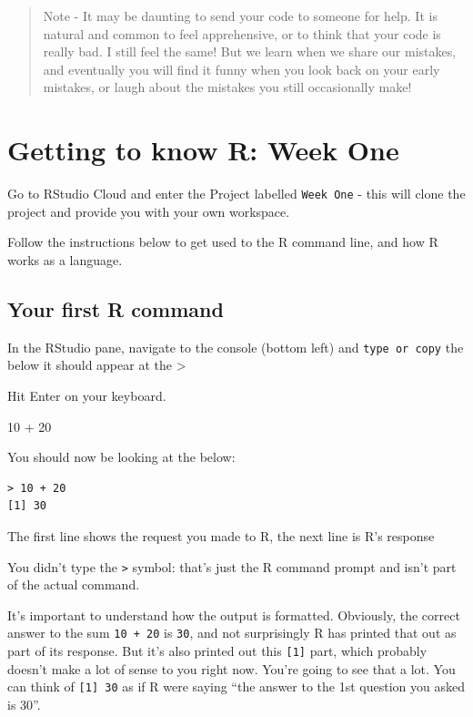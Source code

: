 \documentclass[
]{book}
\newenvironment{Shaded}{\begin{snugshade}}{\end{snugshade}}
\newcommand{\DecValTok}[1]{\textcolor[rgb]{0.00,0.00,0.81}{#1}}
\newcommand{\SpecialCharTok}[1]{\textcolor[rgb]{0.00,0.00,0.00}{#1}}
\begin{document}
\begin{quote}
Note - It may be daunting to send your code to someone for help. It is natural and common to feel apprehensive, or to think that your code is really bad. I still feel the same! But we learn when we share our mistakes, and eventually you will find it funny when you look back on your early mistakes, or laugh about the mistakes you still occasionally make!
\end{quote}

\hypertarget{getting-to-know-r-week-one}{%
\chapter{Getting to know R: Week One}\label{getting-to-know-r-week-one}}

Go to RStudio Cloud and enter the Project labelled \texttt{Week\ One} - this will clone the project and provide you with your own workspace.

Follow the instructions below to get used to the R command line, and how R works as a language.

\hypertarget{your-first-r-command}{%
\section{Your first R command}\label{your-first-r-command}}

In the RStudio pane, navigate to the console (bottom left) and \texttt{type\ or\ copy} the below it should appear at the \textgreater{}

Hit Enter on your keyboard.

\begin{Shaded}
\begin{Highlighting}[]
\DecValTok{10} \SpecialCharTok{+} \DecValTok{20}
\end{Highlighting}
\end{Shaded}

You should now be looking at the below:

\begin{verbatim}
> 10 + 20
[1] 30
\end{verbatim}

The first line shows the request you made to R, the next line is R's response

You didn't type the \texttt{\textgreater{}} symbol: that's just the R command prompt and isn't part of the actual command.

It's important to understand how the output is formatted. Obviously, the correct answer to the sum \texttt{10\ +\ 20} is \texttt{30}, and not surprisingly R has printed that out as part of its response. But it's also printed out this \texttt{{[}1{]}} part, which probably doesn't make a lot of sense to you right now. You're going to see that a lot. You can think of \texttt{{[}1{]}\ 30} as if R were saying ``the answer to the 1st question you asked is 30''.
\end{document}
